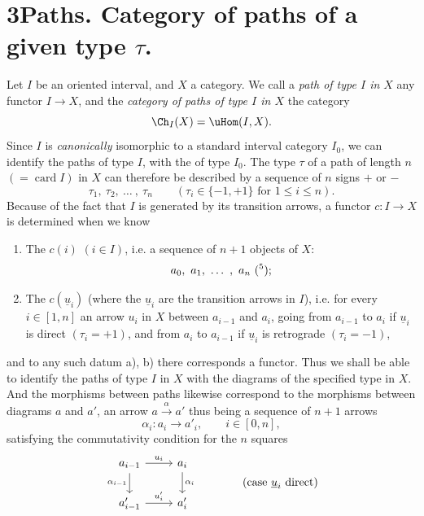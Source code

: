 

\section*{3\quad Paths. Category of paths of a given type $\tau$.}

Let $I$ be an oriented interval, and $X$ a category. We call a \textit{path of type $I$ in $X$} any functor $I \longrightarrow X$, and the \textit{category of paths of type $I$ in $X$} the category
\[
\Ch_I(X) = \uHom(I,X).
\]
Since $I$ is \textit{canonically} isomorphic to a standard interval category $I_0$, we can identify the paths of type $I$, with the of type $I_0$. The type $\tau$ of a path of length $n$ $(= \operatorname{card} I)$ in $X$ can therefore be described by a sequence of $n$ signs $+$ or $-$ %
\[
\tau_1,\ \tau_2,\ \dots\ ,\ \tau_n \qquad (\tau_i \in \{-1,+1\} \text{ for } 1 \leq i \leq n).
\]
Because of the fact that $I$ is generated by its transition arrows, a functor $c : I \longrightarrow X$ is determined when we know %

\begin{enumerate}
\item[a)] The $c(i)$ $(i \in I)$, i.e. a sequence of $n+1$ objects of $X$:
\[
a_0,\ a_1,\ \dots\ ,\ a_n\ (\text{\footnotemark[5]});
\]

\item[b)] The $c(\underline{u}_i)$ (where the $\underline{u}_i$ are the transition arrows in $I$), i.e. for every $i \in [1,n]$ an arrow $u_i$ in $X$ between $a_{i-1}$ and $a_i$, going from $a_{i-1}$ to $a_i$ if $\underline{u}_i$ is direct $(\tau_i = +1)$, and from $a_i$ to $a_{i-1}$ if $\underline{u}_i$ is retrograde $(\tau_i = -1)$,
\end{enumerate}

and to any such datum a), b) there corresponds a functor. Thus we shall be able to identify the paths of type $I$  in $X$ with the diagrams of the specified type in $X$. And the morphisms between paths likewise correspond to the morphisms between diagrams $a$ and $a'$, an arrow $a \xrightarrow{\alpha} a'$ thus being a sequence of $n+1$ arrows
\[
\alpha_i : a_i \longrightarrow a'_i, \qquad i \in [0,n],
\]
satisfying the commutativity condition for the $n$ squares
\[
\begin{tikzcd}
a_{i-1} \arrow[r, "u_i"] \arrow[d, "\alpha_{i-1}"'] & a_i \arrow[d, "\alpha_i"] \\
a'_{i-1} \arrow[r, "u'_i"] & a'_i
\end{tikzcd}
\qquad\qquad \text{(case $\underline{u}_i$ direct)}
\]

